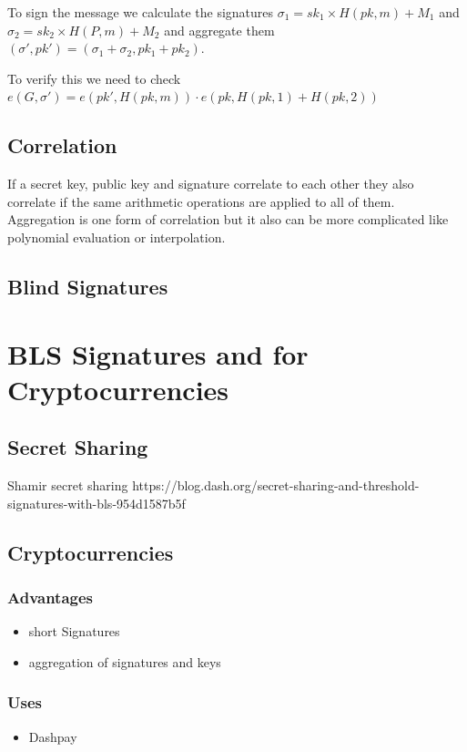 \documentclass[a4paper,12pt]{scrartcl}
\begin{document}
To sign the message we calculate the signatures $\sigma_1 = sk_1 \times{H(pk,m)} + M_1$ and $\sigma_2 = sk_2 \times{H(P,m)} + M_2$ and aggregate them $(\sigma',pk') = (\sigma_1 + \sigma_2, pk_1 + pk_2)$.

To verify this we need to check $e(G,\sigma') = e(pk',H(pk,m)) \cdot e(pk, H(pk,1)+H(pk,2))$

\subsection{Correlation}

If a secret key, public key and signature correlate to each other they also correlate if the same arithmetic operations are applied to all of them. Aggregation is one form of correlation but it also can be more complicated like polynomial evaluation or interpolation.

\subsection{Blind Signatures}

\pagebreak

\section{BLS Signatures and for Cryptocurrencies}
\subsection{Secret Sharing}
Shamir secret sharing https://blog.dash.org/secret-sharing-and-threshold-signatures-with-bls-954d1587b5f
\subsection{Cryptocurrencies}
\subsubsection{Advantages}
\begin{itemize}
	\item short Signatures
	\item aggregation of signatures and keys
\end{itemize}

\subsubsection{Uses}
\begin{itemize}
	\item Dashpay
\end{itemize}
\end{document}
